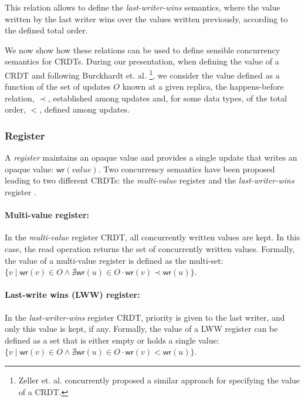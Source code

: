 \documentclass[11pt,a4paper]{article}
\def\land{\mathrel{\wedge}}
\begin{document}
This relation allows to define the \emph{last-writer-wins} semantics, where the 
value written by the last writer wins over the values written previously, 
according to the defined total order.

We now show how these relations can be used to define sensible concurrency semantics
for CRDTs.
During our presentation, when defining the value of a CRDT and 
following Burckhardt et. al. \cite{Burckhardt14Replicated}\footnote{Zeller et. al. \cite{Zeller14Formal}
concurrently proposed a similar approach for specifying the value of a CRDT.}, we 
consider the value defined as a function of the set of updates $O$ known at 
a given replica, the happens-before relation, $\prec$, established among updates and, for some
data types, of the total order, $<$, defined among updates.

\subsubsection{Register}\label{sec:appdev:conc_sem:register}
A \emph{register} maintains an opaque value and provides a single update
that writes an opaque value: $\mathsf{wr}(\mathit{value})$. 
Two concurrency semantics have been proposed leading to two different CRDTs:
the \emph{multi-value} register and the \emph{last-writer-wins} register \cite{Shapiro11Conflict}.

\paragraph{Multi-value register:}
In the \emph{multi-value} register CRDT, all concurrently written values are kept.
In this case, the read operation returns the set of concurrently written values.
Formally, the value of a multi-value register is 
defined as the multi-set:
$\{v \mid \mathsf{wr}(v) \in O \land \nexists \mathsf{wr}(u) \in O \cdot \mathsf{wr}(v) \prec \mathsf{wr}(u)\}$.

\paragraph{Last-write wins (LWW) register:}
In the \emph{last-writer-wins} register CRDT, priority is given to the last writer,
and only this value is kept, if any. 
Formally, the value of a LWW register can be defined 
as a set that is either empty or holds a single value:
$\{v \mid \mathsf{wr}(v) \in O \land \nexists \mathsf{wr}(u) \in O \cdot \mathsf{wr}(v) < \mathsf{wr}(u)\}$.
\end{document}
